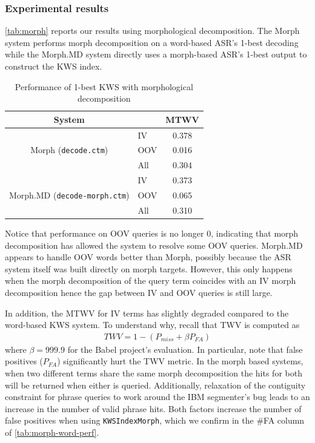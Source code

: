 \documentclass[a4paper,oneside,reqno]{amsart}
\begin{document}
\subsubsection{Experimental results}

\autoref{tab:morph} reports our results using morphological decomposition.
The Morph system performs morph decomposition on a word-based ASR's 1-best
decoding while the Morph.MD system directly uses a morph-based ASR's 1-best
output to construct the KWS index.

\begin{table}[ht!]
  \begin{tabular}{clc}
    \toprule
    System & & MTWV \\
    \midrule
    \multirow{3}{*}{Morph (\texttt{decode.ctm})}
      & IV & 0.378 \\
      & OOV & 0.016 \\
      & All & 0.304 \\
    \multirow{3}{*}{Morph.MD (\texttt{decode-morph.ctm})}
      & IV & 0.373 \\
      & OOV & 0.065 \\
      & All & 0.310 \\
    \bottomrule
  \end{tabular}
  \caption{Performance of 1-best KWS with morphological decomposition}
  \label{tab:morph}
\end{table}

Notice that performance on OOV queries is no longer $0$, indicating that
morph decomposition has allowed the system to resolve some OOV queries.
Morph.MD appears to handle OOV words better than Morph, possibly because
the ASR system itself was built directly on morph targets. However, this
only happens when the morph decomposition of the query term coincides
with an IV morph decomposition hence the gap between IV and OOV queries
is still large.

In addition, the MTWV for IV terms has slightly degraded compared to the
word-based KWS system. To understand why, recall that TWV is computed as
\begin{align}
  \label{eq:twv}
  TWV = 1 - (P_{miss} + \beta P_{FA})
\end{align}
where $\beta = 999.9$ for the Babel project's
evaluation\cite{wang2014depth}.  In particular, note that false positives
($P_{FA}$) significantly hurt the TWV metric. In the morph based systems, when
two different terms share the same morph decomposition the hits for both will
be returned when either is queried.  Additionally, relaxation of the contiguity
constraint for phrase queries to work around the IBM segmenter's bug leads to
an increase in the number of valid phrase hits. Both factors increase the
number of false positives when using \texttt{KWSIndexMorph}, which we confirm
in the \#FA column of \autoref{tab:morph-word-perf}.
\end{document}
